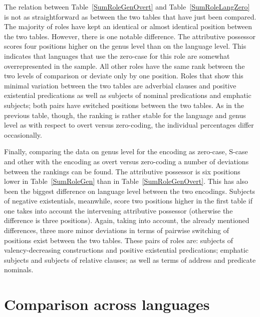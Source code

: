 The relation between Table~\ref{SumRoleGenOvert} and Table~\ref{SumRoleLangZero} is not as straightforward as between the two tables that have just been compared. 
The majority of roles have kept an identical or almost identical position between the two tables. 
However, there is one notable difference. 
The attributive possessor scores four positions higher on the genus level than on the language level. 
This indicates that languages that use the zero-case for this role are somewhat overrepresented in the sample. 
All other roles have the same rank between the two levels of comparison or deviate only by one position. 
Roles that show this minimal variation between the two tables are adverbial clauses and positive existential predications as well as subjects of nominal predications and emphatic subjects; both pairs have switched positions between the two tables. 
As in the previous table, though, the ranking is rather stable for the language and genus level as with respect to overt versus zero-coding, the individual percentages differ occasionally.

Finally, comparing the data on genus level for the encoding as zero-case, S-case and other with the encoding as overt versus zero-coding a number of deviations between the rankings can be found. 
The attributive possessor is six positions lower in Table~\ref{SumRoleGen} than in Table~\ref{SumRoleGenOvert}. 
This has also been the biggest difference on language level between the two encodings. 
Subjects of negative existentials, meanwhile, score two positions higher in the first table if one takes into account the intervening attributive possessor (otherwise the difference is three positions). 
Again, taking into account, the already mentioned differences, three more minor deviations in terms of pairwise switching of positions exist between the two tables. 
These pairs of roles are: subjects of valency-decreasing constructions and positive existential predications; emphatic subjects and subjects of relative clauses; as well as terms of address and predicate nominals. 

\section{Comparison across languages}\label{languagestyp}

